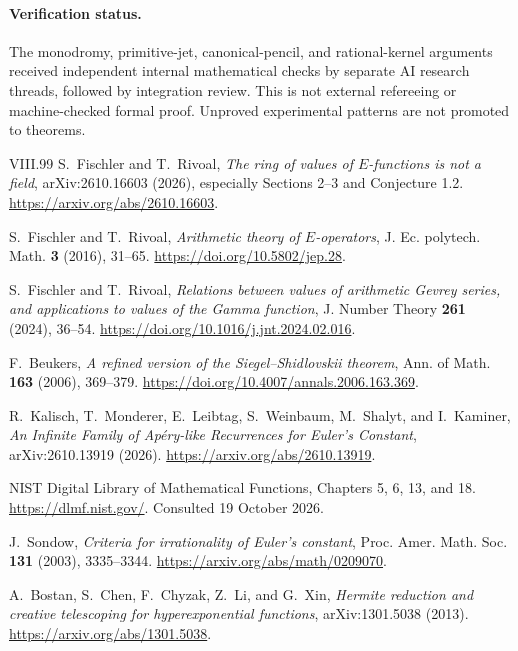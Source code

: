 \documentclass[11pt,a4paper]{article}
\theoremstyle{definition}
\theoremstyle{remark}
\numberwithin{equation}{section}
\begin{document}
\paragraph{Verification status.}
The monodromy, primitive-jet, canonical-pencil, and rational-kernel
arguments received independent internal mathematical checks by
separate AI research threads, followed by integration review.
This is not external refereeing or machine-checked formal proof.
Unproved experimental patterns are not promoted to theorems.


\begin{thebibliography}{VIII.99}
S.~Fischler and T.~Rivoal,
\emph{The ring of values of $E$-functions is not a field},
arXiv:2610.16603 (2026), especially Sections 2--3 and Conjecture 1.2.
\url{https://arxiv.org/abs/2610.16603}.

S.~Fischler and T.~Rivoal,
\emph{Arithmetic theory of $E$-operators},
J. Ec. polytech. Math. \textbf{3} (2016), 31--65.
\url{https://doi.org/10.5802/jep.28}.

S.~Fischler and T.~Rivoal,
\emph{Relations between values of arithmetic Gevrey series,
and applications to values of the Gamma function},
J. Number Theory \textbf{261} (2024), 36--54.
\url{https://doi.org/10.1016/j.jnt.2024.02.016}.

F.~Beukers, \emph{A refined version of the Siegel--Shidlovskii theorem},
Ann. of Math. \textbf{163} (2006), 369--379.
\url{https://doi.org/10.4007/annals.2006.163.369}.

R.~Kalisch, T.~Monderer, E.~Leibtag, S.~Weinbaum, M.~Shalyt,
and I.~Kaminer, \emph{An Infinite Family of Ap\'ery-like Recurrences
for Euler's Constant}, arXiv:2610.13919 (2026).
\url{https://arxiv.org/abs/2610.13919}.

NIST Digital Library of Mathematical Functions,
Chapters 5, 6, 13, and 18.
\url{https://dlmf.nist.gov/}. Consulted 19 October 2026.

J.~Sondow, \emph{Criteria for irrationality of Euler's constant},
Proc. Amer. Math. Soc. \textbf{131} (2003), 3335--3344.
\url{https://arxiv.org/abs/math/0209070}.

A.~Bostan, S.~Chen, F.~Chyzak, Z.~Li, and G.~Xin,
\emph{Hermite reduction and creative telescoping for hyperexponential
functions}, arXiv:1301.5038 (2013).
\url{https://arxiv.org/abs/1301.5038}.


\end{thebibliography}
\end{document}

